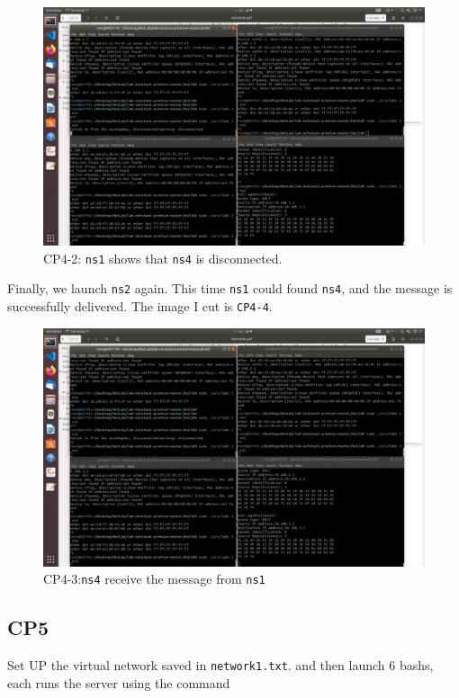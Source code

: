 \documentclass[11pt]{article}
\begin{document}
	\begin{figure}[htbp]
		\centering
		\includegraphics[width=0.9\linewidth]{../lab-netstack-premium-master/checkpoints/CP4-2.png}
		\caption{CP4-2: \texttt{ns1} shows that \texttt{ns4} is disconnected.}
		\label{fig:CP4-2}
	\end{figure}
	
	\par Finally, we launch \texttt{ns2} again. This time \texttt{ns1} could found \texttt{ns4}, and the message is successfully delivered. The image I cut is \texttt{CP4-4}.
	
	\begin{figure}[htbp]
		\centering
		\includegraphics[width=0.8\linewidth]{../lab-netstack-premium-master/checkpoints/CP4-3.png}
		\caption{CP4-3:\texttt{ns4} receive the message from \texttt{ns1}}
		\label{fig:CP4-3}
	\end{figure}
		
	\subsection*{CP5}
	
	\par Set UP the virtual network saved in \texttt{network1.txt}. and then launch 6 bashs, each runs the server using the command
	
\end{document}
